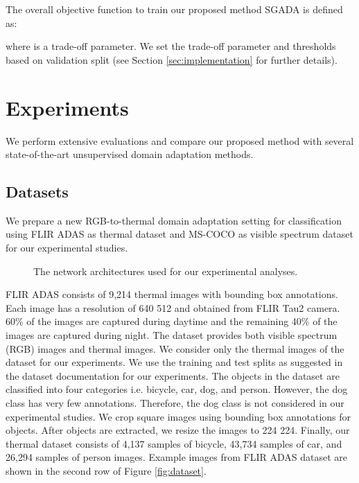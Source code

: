 \documentclass[final]{cvpr}
\begin{document}
The overall objective function to train our proposed method SGADA is defined as:


where  is a trade-off parameter. We set the trade-off parameter  and thresholds based on validation split (see Section \ref{sec:implementation} for further details).

\section{Experiments}
\label{sec:experiments}

We perform extensive evaluations and compare our proposed method with several state-of-the-art unsupervised domain adaptation methods.

\subsection{Datasets}

We prepare a new RGB-to-thermal domain adaptation setting for classification using FLIR ADAS \cite{flir} as thermal dataset and MS-COCO \cite{mscoco} as visible spectrum dataset for our experimental studies.
\vspace{2mm}

\begin{figure*}[ht]
\centering
    \vspace{3mm}
    \caption{The network architectures used for our experimental analyses.}
    \label{fig:architecture}
\end{figure*}

FLIR ADAS \cite{flir} consists of 9,214 thermal images with bounding box annotations. Each image has a resolution of 640  512 and obtained from FLIR Tau2 camera. 60\% of the images are captured during daytime and the remaining 40\% of the images are captured during night. The dataset provides both visible spectrum (RGB) images and thermal images. We consider only the thermal images of the dataset for our experiments. We use the training and test splits as suggested in the dataset documentation for our experiments. The objects in the dataset are classified into four categories i.e. bicycle, car, dog, and person. However, the dog class has very few annotations. Therefore, the dog class is not considered in our experimental studies. We crop square images using bounding box annotations for objects. After objects are extracted, we resize the images to 224  224. Finally, our thermal dataset consists of 4,137 samples of bicycle, 43,734 samples of car, and 26,294 samples of person images. Example images from FLIR ADAS dataset are shown in the second row of Figure \ref{fig:dataset}.
\end{document}
